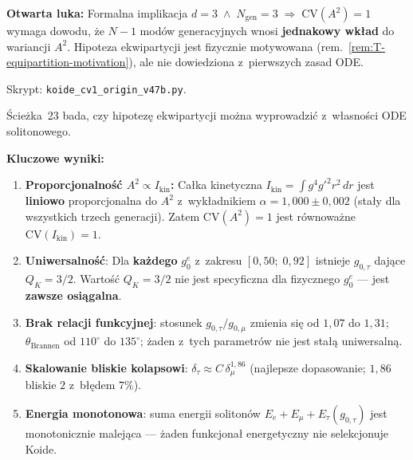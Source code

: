 \begin{remark}[Dlaczego $\mathrm{CV} = 1$? --- \'scie\.zka 22 (v47b)]
\medskip\noindent
\textbf{Otwarta luka:}
Formalna implikacja
$d = 3 \;\wedge\; N_{\mathrm{gen}} = 3 \;\Longrightarrow\;
\mathrm{CV}(A^2) = 1$ wymaga dowodu,
\.ze $N{-}1$ mod\'ow generacyjnych wnosi
\textbf{jednakowy wk\l{}ad} do wariancji $A^2$.
Hipoteza ekwipartycji jest fizycznie motywowana
(rem.~\ref{rem:T-equipartition-motivation}),
ale nie dowiedziona z~pierwszych zasad ODE.

Skrypt: \texttt{koide\_cv1\_origin\_v47b.py}.
\end{remark}

\begin{remark}%
\label{rem:T-equipartition-test}
\'Scie\.zka~23 bada, czy hipotez\k{e} ekwipartycji mo\.zna
wyprowadzi\'c z~w\l{}asno\'sci ODE solitonowego.

\medskip\noindent
\textbf{Kluczowe wyniki:}
\begin{enumerate}[nosep]
  \item \textbf{Proporcjonalno\'s\'c $A^2 \propto I_{\mathrm{kin}}$:}
    Ca\l{}ka kinetyczna $I_{\mathrm{kin}} = \int g^4 g'^2 r^2\,dr$ jest
    \textbf{liniowo} proporcjonalna do $A^2$ z~wyk\l{}adnikiem
    $\alpha = 1{,}000 \pm 0{,}002$ (sta\l{}y dla wszystkich trzech
    generacji).
    Zatem $\mathrm{CV}(A^2) = 1$ jest r\'ownowa\.zne
    $\mathrm{CV}(I_{\mathrm{kin}}) = 1$.
  \item \textbf{Uniwersalno\'s\'c}: Dla \textbf{ka\.zdego} $g_0^e$
    z~zakresu $[0{,}50;\; 0{,}92]$ istnieje $g_{0,\tau}$ daj\k{a}ce
    $Q_K = 3/2$. Warto\'s\'c $Q_K = 3/2$ nie jest specyficzna
    dla fizycznego $g_0^e$ --- jest \textbf{zawsze osi\k{a}galna}.
  \item \textbf{Brak relacji funkcyjnej}: stosunek
    $g_{0,\tau}/g_{0,\mu}$ zmienia si\k{e} od $1{,}07$ do $1{,}31$;
    $\theta_{\mathrm{Brannen}}$ od $110^\circ$ do $135^\circ$;
    \.zaden z~tych parametr\'ow nie jest sta\l{}\k{a} uniwersaln\k{a}.
  \item \textbf{Skalowanie bliskie kolapsowi}:
    $\delta_\tau \approx C\,\delta_\mu^{1{,}86}$
    (najlepsze dopasowanie; $1{,}86$ bliskie $2$
    z~b\l{}\k{e}dem $7\%$).
  \item \textbf{Energia monotonowa}: suma energii soliton\'ow
    $E_e + E_\mu + E_\tau(g_{0,\tau})$ jest monotonicznie
    malej\k{a}ca --- \.zaden funkcjona\l{} energetyczny nie
    selekcjonuje Koide.
\end{enumerate}


\end{remark}
